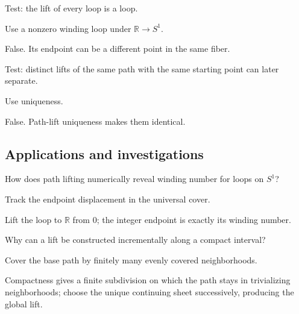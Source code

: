 \begin{exercise}\label{exr:viii11-ped-11}
Test: the lift of every loop is a loop.
\end{exercise}
\begin{hint}
Use a nonzero winding loop under $\mathbb R\to S^1$.
\end{hint}
\begin{solution}
False. Its endpoint can be a different point in the same fiber.
\end{solution}

\begin{exercise}\label{exr:viii11-ped-12}
Test: distinct lifts of the same path with the same starting point can later separate.
\end{exercise}
\begin{hint}
Use uniqueness.
\end{hint}
\begin{solution}
False. Path-lift uniqueness makes them identical.
\end{solution}

\subsection*{Applications and investigations}

\begin{exercise}\label{exr:viii11-ped-13}
How does path lifting numerically reveal winding number for loops on $S^1$?
\end{exercise}
\begin{hint}
Track the endpoint displacement in the universal cover.
\end{hint}
\begin{solution}
Lift the loop to $\mathbb R$ from $0$; the integer endpoint is exactly its winding number.
\end{solution}

\begin{exercise}\label{exr:viii11-ped-14}
Why can a lift be constructed incrementally along a compact interval?
\end{exercise}
\begin{hint}
Cover the base path by finitely many evenly covered neighborhoods.
\end{hint}
\begin{solution}
Compactness gives a finite subdivision on which the path stays in trivializing neighborhoods; choose the unique continuing sheet successively, producing the global lift.
\end{solution}

